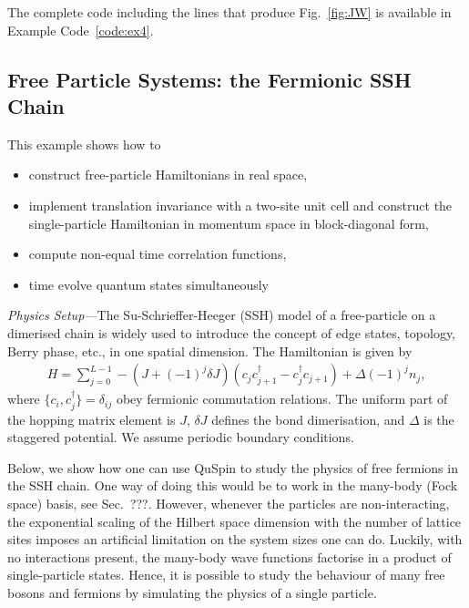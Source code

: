 \documentclass{SciPost}
\newcommand\0{\scalebox{-1}[1]{0}}
\begin{document}
The complete code including the lines that produce Fig.~\ref{fig:JW} is available in Example Code~\ref{code:ex4}.



\subsection{Free Particle Systems: the Fermionic SSH Chain}

\label{subsec:SSH_model}

This example shows how to
\begin{itemize}
	\item construct free-particle Hamiltonians in real space,
	\item implement translation invariance with a two-site unit cell and construct the single-particle Hamiltonian in momentum space in block-diagonal form,
	\item compute non-equal time correlation functions,
	\item time evolve quantum states simultaneously
\end{itemize}

\noindent\emph{Physics Setup---}The Su-Schrieffer-Heeger (SSH) model of a free-particle on a dimerised chain is widely used to introduce the concept of edge states, topology, Berry phase, etc., in one spatial dimension. The Hamiltonian is given by
\begin{eqnarray}
H = \sum_{j=0}^{L-1} -(J+(-1)^j\delta J)\left(c_jc^\dagger_{j+1} - c^\dagger_{j}c_{j+1}\right) + \Delta(-1)^jn_j, 
\label{eq:SSH}
\end{eqnarray}
where $\{c_i,c^\dagger_j\}=\delta _{ij}$ obey fermionic commutation relations. The uniform part of the hopping matrix element is $J$, $\delta J$ defines the bond dimerisation, and $\Delta$ is the staggered potential. We assume periodic boundary conditions.

Below, we show how one can use QuSpin to study the physics of free fermions in the SSH chain. One way of doing this would be to work in the many-body (Fock space) basis, see Sec.~???. However, whenever the particles are non-interacting, the exponential scaling of the Hilbert space dimension with the number of lattice sites imposes an artificial limitation on the system sizes one can do. Luckily, with no interactions present, the many-body wave functions factorise in a product of single-particle states. Hence, it is possible to study the behaviour of many free bosons and fermions by simulating the physics of a single particle.
\end{document}
